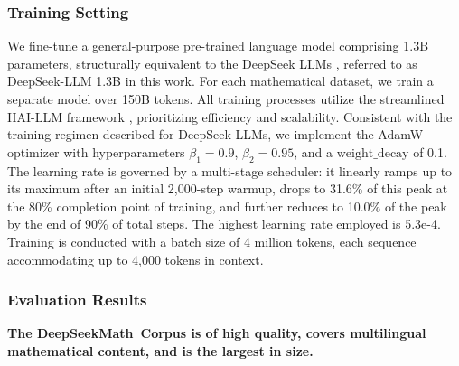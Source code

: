 \begin{itemize}[topsep=0pt]
\subsubsection{Training Setting}
\label{sec:quality-policy}
We fine-tune a general-purpose pre-trained language model comprising 1.3B parameters, structurally equivalent to the DeepSeek LLMs \citep{deepseek-llm}, referred to as DeepSeek-LLM 1.3B in this work. For each mathematical dataset, we train a separate model over 150B tokens. All training processes utilize the streamlined HAI-LLM framework \citep{haillm}, prioritizing efficiency and scalability. Consistent with the training regimen described for DeepSeek LLMs, we implement the AdamW optimizer \citep{adamW} with hyperparameters $\beta_1=0.9$, $\beta_2=0.95$, and a $\mathrm{weight\_decay}$ of 0.1. The learning rate is governed by a multi-stage scheduler: it linearly ramps up to its maximum after an initial 2,000-step warmup, drops to 31.6\% of this peak at the 80\% completion point of training, and further reduces to 10.0\% of the peak by the end of 90\% of total steps. The highest learning rate employed is 5.3e-4. Training is conducted with a batch size of 4 million tokens, each sequence accommodating up to 4,000 tokens in context.

\subsubsection{Evaluation Results}

\textbf{The DeepSeekMath~Corpus is of high quality, covers multilingual mathematical content, and is the largest in size.}


\end{itemize}
